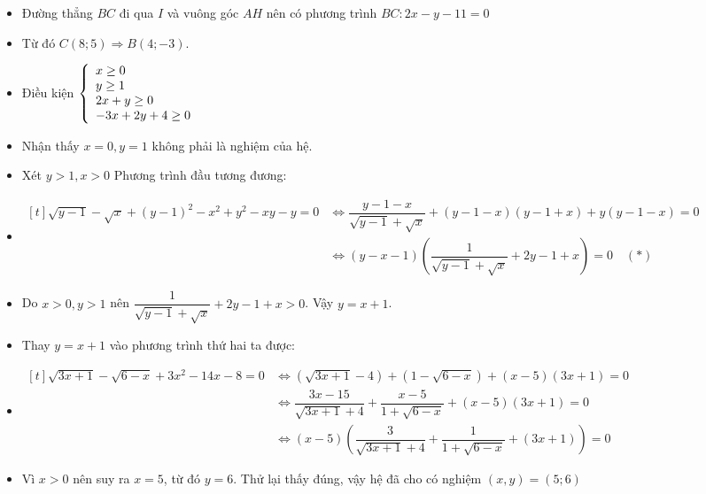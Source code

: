 \begin{itemize}[label=,leftmargin=*]
\item Đường thẳng $BC$ đi qua $I$ và vuông góc $AH$ nên có phương trình $BC:2x-y-11=0$
\item Từ đó $C(8;5)\Rightarrow B(4;-3)$.
\end{itemize}
\lgi 
\begin{itemize}[label=,leftmargin=*]
\item Điều kiện $\left\{\begin{array}{ll}x\ge 0 \\ y\ge 1 \\ 2x+y\ge 0 \\ -3x+2y+4 \ge 0\end{array}\right.$
\item Nhận thấy $x=0,y=1$ không phải là nghiệm của hệ.
\item Xét $y>1, x>0$ Phương trình đầu tương đương:
\item $\begin{aligned}[t]\sqrt{y-1}-\sqrt{x}+(y-1)^2-x^2+y^2-xy-y=0 & \Leftrightarrow \dfrac{y-1-x}{\sqrt{y-1}+\sqrt{x}}+(y-1-x)(y-1+x)+y(y-1-x)=0 
\\
 &\Leftrightarrow (y-x-1)\left(\dfrac{1}{\sqrt{y-1}+\sqrt{x}}+2y-1+x  \right)=0 \quad (*)
 \end{aligned}$
 \item Do $x>0,y>1$ nên $\dfrac{1}{\sqrt{y-1}+\sqrt{x}}+2y-1+x  >0$. Vậy $y=x+1$.
 \item Thay $y=x+1$ vào phương trình thứ hai ta được:
 \item $\begin{aligned}[t] \sqrt{3x+1}-\sqrt{6-x}+3x^2-14x-8=0 &\Leftrightarrow (\sqrt{3x+1}-4)+(1-\sqrt{6-x})+(x-5)(3x+1)=0  \\ 
 &\Leftrightarrow \dfrac{3x-15}{\sqrt{3x+1}+4}+\dfrac{x-5}{1+\sqrt{6-x}}+(x-5)(3x+1)=0 \\
 &\Leftrightarrow (x-5)\left(\dfrac{3}{\sqrt{3x+1}+4}+\dfrac{1}{1+\sqrt{6-x}}+(3x+1) \right)=0
 \end{aligned}$
 \item Vì $x>0$ nên suy ra $x=5$, từ đó $y=6$. Thử lại thấy đúng, vậy hệ đã cho có nghiệm $(x,y)=(5;6)$
\end{itemize}

